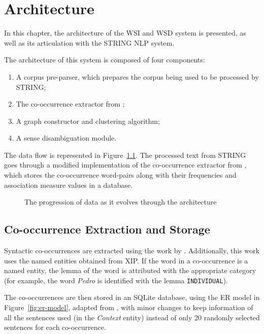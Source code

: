 \chapter{Architecture}
\label{ch:architecture}

In this chapter, the architecture of the \ac{WSI} and \ac{WSD} system is 
presented, as well as its 
articulation with the \ac{STRING} \ac{NLP} system.

The architecture of this system is composed of four components:

\begin{enumerate}
  \item A corpus pre-parser, which prepares the corpus being used to be
processed by \ac{STRING};
  \item The co-occurrence extractor from \citep{correia2015syntax};
  \item A graph constructor and clustering algorithm;
  \item A sense disambiguation module.
\end{enumerate}

The data flow is represented in Figure~\ref{fig:data-progression}. The 
processed text from \ac{STRING} 
goes through a modified implementation of the co-occurrence extractor from 
\citep{correia2015syntax}, which stores the co-occurrence word-pairs along with 
their frequencies and association measure values in a database.

\begin{figure}[ht]
 \caption{The progression of data as it evolves through the architecture}
 \label{fig:data-progression}
 \centering
 
\end{figure}

\section{Co-occurrence Extraction and Storage}

Syntactic co-occurrences are extracted using the work by
\citet{correia2015syntax}. Additionally, this work uses the named entities
obtained from \ac{XIP}. If the word in a co-occurrence is a named entity, the
lemma of the word is attributed with the appropriate category (for example, the
word \emph{Pedro} is identified with the lemma \texttt{INDIVIDUAL}).

The co-occurrences are then stored in an SQLite database, using the \ac{ER} model in
Figure~\ref{fig:er-model}, adapted from \citet{correia2015syntax}, with minor 
changes to keep information of all the sentences used (in the \emph{Context}
entity) instead of only 20 randomly selected sentences for each co-occurrence.

